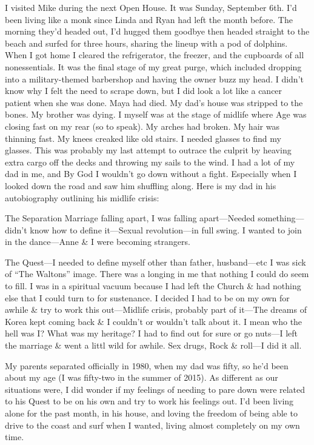 \documentclass[12pt]{book}
\begin{document}
I visited Mike during the next Open House. It was Sunday, September 6th. I'd been living like a monk since Linda and Ryan had left the month before. The morning they'd headed out, I'd hugged them goodbye then headed straight to the beach and surfed for three hours, sharing the lineup with a pod of dolphins. When I got home I cleared the refrigerator, the freezer, and the cupboards of all nonessentials. It was the final stage of my great purge, which included dropping into a military-themed barbershop and having the owner buzz my head. I didn't know why I felt the need to scrape down, but I did look a lot like a cancer patient when she was done. Maya had died. My dad's house was stripped to the bones. My brother was dying. I myself was at the stage of midlife where Age was closing fast on my rear (so to speak). My arches had broken. My hair was thinning fast. My knees creaked like old stairs. I needed glasses to find my glasses. This was probably my last attempt to outrace the culprit by heaving extra cargo off the decks and throwing my sails to the wind. I had a lot of my dad in me, and By God I wouldn't go down without a fight. Especially when I looked down the road and saw him shuffling along. Here is my dad in his autobiography outlining his midlife crisis:

The Separation Marriage falling apart, I was falling apart---Needed something---didn't know how to define it---Sexual revolution---in full swing. I wanted to join in the dance---Anne \& I were becoming strangers.

The Quest---I needed to define myself other than father, husband---etc I was sick of ``The Waltons'' image. There was a longing in me that nothing I could do seem to fill. I was in a spiritual vacuum because I had left the Church \& had nothing else that I could turn to for sustenance. I decided I had to be on my own for awhile \& try to work this out---Midlife crisis, probably part of it---The dreams of Korea kept coming back \& I couldn't or wouldn't talk about it. I mean who the hell was I? What was my heritage? I had to find out for sure or go nuts---I left the marriage \& went a littl wild for awhile. Sex drugs, Rock \& roll---I did it all.

My parents separated officially in 1980, when my dad was fifty, so he'd been about my age (I was fifty-two in the summer of 2015). As different as our situations were, I did wonder if my feelings of needing to pare down were related to his Quest to be on his own and try to work his feelings out. I'd been living alone for the past month, in his house, and loving the freedom of being able to drive to the coast and surf when I wanted, living almost completely on my own time.
\end{document}
